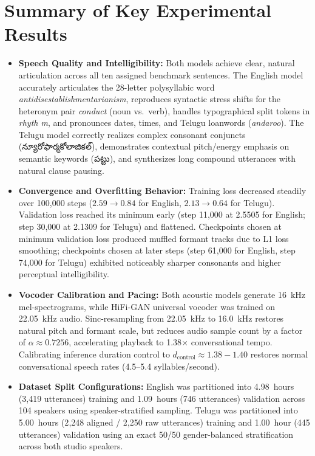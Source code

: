 \documentclass[11pt,a4paper]{report}
\newcommand{\texttelugu}[1]{{\telugufont #1}}
\begin{document}
\section{Summary of Key Experimental Results}
\begin{itemize}
    \item \textbf{Speech Quality and Intelligibility:} Both models achieve clear, natural articulation across all ten assigned benchmark sentences. The English model accurately articulates the 28-letter polysyllabic word \textit{antidisestablishmentarianism}, reproduces syntactic stress shifts for the heteronym pair \textit{conduct} (noun vs.\ verb), handles typographical split tokens in \textit{rhyth  m}, and pronounces dates, times, and Telugu loanwords (\textit{andaroo}). The Telugu model correctly realizes complex consonant conjuncts (\texttelugu{న్యూరోఫార్మకోలాజికల్}), demonstrates contextual pitch/energy emphasis on semantic keywords (\texttelugu{పట్టు}), and synthesizes long compound utterances with natural clause pausing.
    \item \textbf{Convergence and Overfitting Behavior:} Training loss decreased steadily over 100{,}000 steps ($2.59 \to 0.84$ for English, $2.13 \to 0.64$ for Telugu). Validation loss reached its minimum early (step 11{,}000 at 2.5505 for English; step 30{,}000 at 2.1309 for Telugu) and flattened. Checkpoints chosen at minimum validation loss produced muffled formant tracks due to L1 loss smoothing; checkpoints chosen at later steps (step 61{,}000 for English, step 74{,}000 for Telugu) exhibited noticeably sharper consonants and higher perceptual intelligibility.
    \item \textbf{Vocoder Calibration and Pacing:} Both acoustic models generate 16~kHz mel-spectrograms, while HiFi-GAN universal vocoder was trained on 22.05~kHz audio. Sinc-resampling from 22.05~kHz to 16.0~kHz restores natural pitch and formant scale, but reduces audio sample count by a factor of $\alpha \approx 0.7256$, accelerating playback to 1.38$\times$ conversational tempo. Calibrating inference duration control to $d_{\text{control}} \approx 1.38 - 1.40$ restores normal conversational speech rates (4.5--5.4 syllables/second).
    \item \textbf{Dataset Split Configurations:} English was partitioned into 4.98~hours (3{,}419 utterances) training and 1.09~hours (746 utterances) validation across 104 speakers using speaker-stratified sampling. Telugu was partitioned into 5.00~hours (2{,}248 aligned / 2{,}250 raw utterances) training and 1.00~hour (445 utterances) validation using an exact 50/50 gender-balanced stratification across both studio speakers.
\end{itemize}
\end{document}
